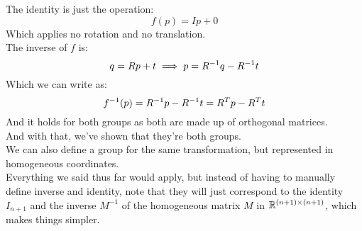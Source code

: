 \documentclass[12pt]{article}
\begin{document}
The identity is just the operation:
\[ f(p) = Ip + 0 \]
Which applies no rotation and no translation. \\

The inverse of $f$ is:
\[ q = Rp + t \implies  p = R^{-1} q - R^{-1} t \]
Which we can write as:
\[ f^{-1}(p) = R^{-1} p - R^{-1} t =
R^T p - R^T t \]
And it holds for both groups
as both are made up of orthogonal matrices. \\

And with that, we've shown that they're
both groups. \\

We can also define a group for the same
transformation, but represented
in homogeneous coordinates. \\
Everything we said thus far would apply,
but instead of having to manually define
inverse and identity,
note that they will just correspond
to the identity $I_{n+1}$
and the inverse $M^{-1}$
of the homogeneous matrix $M$ 
in $\mathbb{R}^{(n+1) \times (n+1)}$,
which makes things simpler. \\

\newpage
\end{document}
